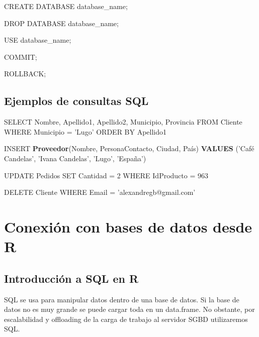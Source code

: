 \documentclass[]{book}
\newenvironment{Shaded}{\begin{snugshade}}{\end{snugshade}}
\newcommand{\KeywordTok}[1]{\textcolor[rgb]{0.13,0.29,0.53}{\textbf{#1}}}
\newcommand{\DecValTok}[1]{\textcolor[rgb]{0.00,0.00,0.81}{#1}}
\newcommand{\StringTok}[1]{\textcolor[rgb]{0.31,0.60,0.02}{#1}}
\newcommand{\NormalTok}[1]{#1}
\begin{document}
\begin{Shaded}
\begin{Highlighting}[]
\NormalTok{CREATE DATABASE database_name;}

\NormalTok{DROP DATABASE database_name;}

\NormalTok{USE database_name;}

\NormalTok{COMMIT;}

\NormalTok{ROLLBACK;}
\end{Highlighting}
\end{Shaded}

\subsection{Ejemplos de consultas SQL}\label{ejemplos-de-consultas-sql}

\begin{Shaded}
\begin{Highlighting}[]
\NormalTok{SELECT Nombre, Apellido1, Apellido2, Municipio, Provincia }
\NormalTok{FROM Cliente}
\NormalTok{WHERE Municipio =}\StringTok{ 'Lugo'}
\NormalTok{ORDER BY Apellido1}

\NormalTok{INSERT }\KeywordTok{Proveedor}\NormalTok{(Nombre, PersonaContacto, Ciudad, País)}
\KeywordTok{VALUES}\NormalTok{ (}\StringTok{'Café Candelas'}\NormalTok{, }\StringTok{'Ivana Candelas'}\NormalTok{, }\StringTok{'Lugo'}\NormalTok{, }\StringTok{'España'}\NormalTok{)}

\NormalTok{UPDATE Pedidos}
\NormalTok{SET Cantidad =}\StringTok{ }\DecValTok{2}
\NormalTok{WHERE IdProducto =}\StringTok{ }\DecValTok{963}

\NormalTok{DELETE Cliente}
\NormalTok{WHERE Email =}\StringTok{ 'alexandregb@gmail.com'}
\end{Highlighting}
\end{Shaded}

\section{Conexión con bases de datos desde
R}\label{conexiuxf3n-con-bases-de-datos-desde-r}

\subsection{Introducción a SQL en R}\label{introducciuxf3n-a-sql-en-r}

SQL se usa para manipular datos dentro de una base de datos. Si la base
de datos no es muy grande se puede cargar toda en un data.frame. No
obstante, por escalabilidad y offloading de la carga de trabajo al
servidor SGBD utilizaremos SQL.
\end{document}
